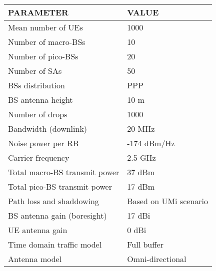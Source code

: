 \documentclass[journal]{IEEEtran}
\begin{document}
\begin{table}
\centering
\caption{}
\label{tab:parameters}
    \begin{tabular}{|m{4cm}|m{4cm}|}
    \hline
    \textbf{PARAMETER}                   & \textbf{VALUE}                                             \\ \hline
    Mean number of UEs          & 1000                                              \\ \hline
    Number of macro-BSs         & 10                                                \\ \hline
    Number of pico-BSs          & 20                                                \\ \hline
    Number of SAs               & 50                                                \\ \hline
    BSs distribution            & PPP                                     \\ \hline
    BS antenna height           & 10 m                                              \\ \hline
    Number of drops             & 1000                                              \\ \hline
    Bandwidth (downlink)        & 20 MHz                                            \\ \hline
    Noise power per RB          & -174 dBm/Hz                                      \\ \hline
    Carrier frequency           & 2.5 GHz                                           \\ \hline
    Total macro-BS transmit power     & 37 dBm                                   \\ \hline
    Total pico-BS transmit power     & 17 dBm                                   \\ \hline
    Path loss and shaddowing    & Based on UMi scenario \cite{ITU-R2008}            \\ \hline
    BS antenna gain (boresight) & 17 dBi                                            \\ \hline
    UE antenna gain             & 0 dBi                                             \\ \hline
    Time domain traffic model   & Full buffer                                       \\ \hline
    Antenna model               & Omni-directional                                  \\ \hline

\end{tabular}
\end{table}
\end{document}
